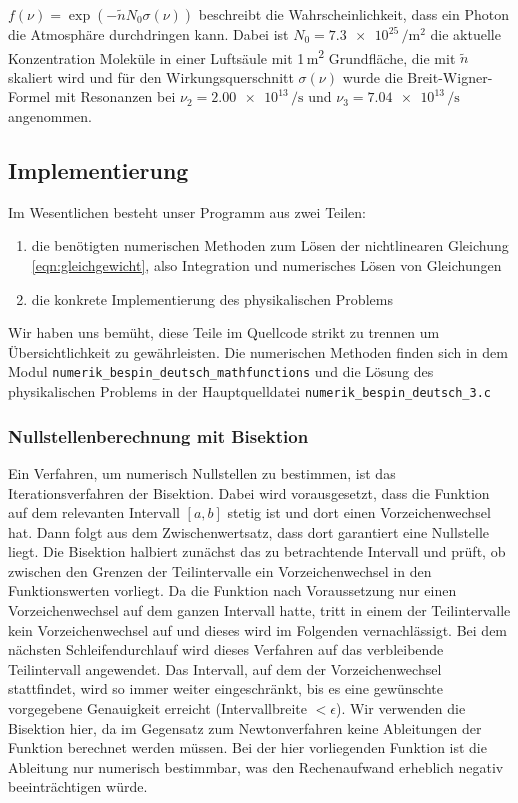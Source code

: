 \documentclass[10pt,a4paper]{article}
\begin{document}
$f(\nu) = \exp\left(-\tilde{n} N_0 \sigma(\nu) \right) $ beschreibt die Wahrscheinlichkeit, dass ein Photon die Atmosphäre durchdringen kann. Dabei ist $N_0 = \num{7.3e25}\,\si{\per\metre^2}$ die aktuelle Konzentration  Moleküle in einer Luftsäule mit 1\,\si{\metre^2} Grundfläche, die mit $\tilde{n}$ skaliert wird und für den Wirkungsquerschnitt $\sigma(\nu)$ wurde die Breit-Wigner-Formel mit Resonanzen bei $\nu_2 = \num{2.00e13}\, \si{\per\second}$ und $\nu_3 = \num{7.04e13}\, \si{\per\second}$ angenommen.


\subsection{Implementierung}
Im Wesentlichen besteht unser Programm aus zwei Teilen:
\begin{enumerate}
	\item die benötigten numerischen Methoden zum Lösen der nichtlinearen Gleichung \ref{eqn:gleichgewicht}, also Integration und numerisches Lösen von Gleichungen
	\item die konkrete Implementierung des physikalischen Problems
\end{enumerate}
Wir haben uns bemüht, diese Teile im Quellcode strikt zu trennen um Übersichtlichkeit zu gewährleisten. Die numerischen Methoden finden sich in dem Modul \texttt{numerik\_bespin\_deutsch\_mathfunctions} und die Lösung des physikalischen Problems in der Hauptquelldatei \texttt{numerik\_bespin\_deutsch\_3.c}

\subsubsection{Nullstellenberechnung mit Bisektion}

Ein Verfahren, um numerisch Nullstellen zu bestimmen, ist das Iterationsverfahren der Bisektion. Dabei wird vorausgesetzt, dass die Funktion auf dem relevanten Intervall $[a,b]$ stetig ist und dort einen Vorzeichenwechsel hat. Dann folgt aus dem Zwischenwertsatz, dass dort garantiert eine Nullstelle liegt. Die Bisektion halbiert zunächst das zu betrachtende Intervall und prüft, ob zwischen den Grenzen der Teilintervalle ein Vorzeichenwechsel in den Funktionswerten vorliegt. Da die Funktion nach Voraussetzung nur einen Vorzeichenwechsel auf dem ganzen Intervall hatte, tritt in einem der Teilintervalle kein Vorzeichenwechsel auf und dieses wird im Folgenden vernachlässigt. Bei dem nächsten Schleifendurchlauf wird dieses Verfahren auf das verbleibende Teilintervall angewendet. Das Intervall, auf dem der Vorzeichenwechsel stattfindet, wird so immer weiter eingeschränkt, bis es eine gewünschte vorgegebene Genauigkeit erreicht (Intervallbreite $<\epsilon$). 
Wir verwenden die Bisektion hier, da im Gegensatz zum Newtonverfahren keine Ableitungen der Funktion  berechnet werden müssen. Bei der hier vorliegenden Funktion ist die Ableitung nur numerisch bestimmbar, was den Rechenaufwand erheblich negativ beeinträchtigen würde.
\end{document}
